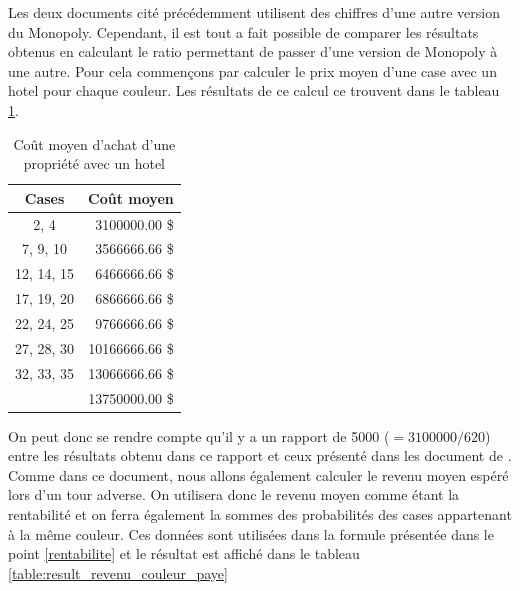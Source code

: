 \documentclass[letterpaper]{article}
\begin{document}
    Les deux documents cité précédemment utilisent
    des chiffres d'une autre version du Monopoly.  Cependant, il est
    tout a fait possible de comparer les résultats obtenus en calculant
    le ratio permettant de passer d'une version de Monopoly à une autre.
    Pour cela commençons par calculer le prix moyen d'une case avec un
    hotel pour chaque couleur.  Les résultats de ce calcul ce trouvent
    dans le tableau \ref{table:result_cout_couleur}.
    
    \begin{table}
      \centering
      \begin{tabular}{|c|r|}
      \hline
      \multicolumn{1}{|c|}{\textbf{Cases}} &
      \multicolumn{1}{c|}{\textbf{Coût moyen}} \\ \hline
      \cellcolor[HTML]{A0522D} 2, 4 & 3100000.00 \$ \\ \hline
      \cellcolor[HTML]{1E90FF} 7, 9, 10 & 3566666.66 \$ \\ \hline
      \cellcolor[HTML]{FF69B4} 12, 14, 15 & 6466666.66 \$ \\ \hline
      \cellcolor[HTML]{FF8C00} 17, 19, 20 & 6866666.66 \$ \\ \hline
      \cellcolor[HTML]{FF4500} 22, 24, 25 & 9766666.66 \$ \\ \hline
      \cellcolor[HTML]{FFD700} 27, 28, 30 & 10166666.66 \$ \\ \hline
      \cellcolor[HTML]{2E8B57} 32, 33, 35 & 13066666.66 \$ \\ \hline
      \cellcolor[HTML]{483D8B} \textcolor{white}{38, 40} & 13750000.00 \$ \\ \hline
      \end{tabular}
      \caption{Coût moyen d'achat d'une propriété avec un hotel}
      \label{table:result_cout_couleur}
    \end{table}
    
    On peut donc se rendre compte qu'il y a un rapport de 5000 
    ($= 3100000 / 620$) entre les résultats obtenu dans ce 
    rapport et ceux présenté dans les document de \cite{PP_MONOPOLY}.
    Comme dans ce document, nous allons également calculer le 
    revenu moyen espéré lors d'un tour adverse.  On utilisera
    donc le revenu moyen comme étant la rentabilité et on ferra
    également la sommes des probabilités des cases appartenant 
    à la même couleur. Ces données sont utilisées dans la 
    formule présentée dans le point \ref{rentabilite} et le résultat
    est affiché dans le tableau \ref{table:result_revenu_couleur_paye}
    
\end{document}
